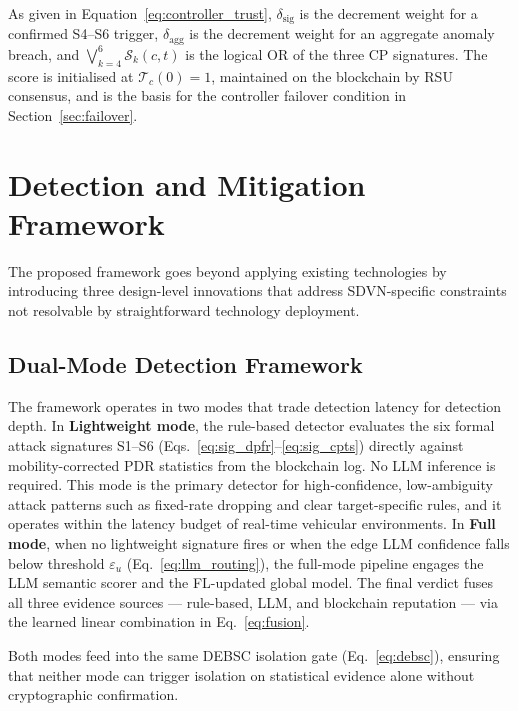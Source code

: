 \documentclass[12pt, a4paper]{report}
\begin{document}
As given in Equation~\eqref{eq:controller_trust},
$\delta_{\text{sig}}$ is the decrement weight for a confirmed
S4--S6 trigger, $\delta_{\text{agg}}$ is the decrement weight for
an aggregate anomaly breach, and $\bigvee_{k=4}^{6}\mathcal{S}_k
(c,t)$ is the logical OR of the three CP signatures. The score
is initialised at $\mathcal{T}_c(0)=1$, maintained on the
blockchain by RSU consensus, and is the basis for the controller
failover condition in Section~\ref{sec:failover}.

\section{Detection and Mitigation Framework}
\label{sec:design}

The proposed framework goes beyond applying existing technologies by
introducing three design-level innovations that address SDVN-specific
constraints not resolvable by straightforward technology deployment.





\subsection{Dual-Mode Detection Framework}

The framework operates in two modes that trade detection latency for detection depth.
In \textbf{Lightweight mode}, the rule-based detector evaluates the six formal attack signatures S1--S6 (Eqs.~\eqref{eq:sig_dpfr}--\eqref{eq:sig_cpts}) directly against mobility-corrected PDR statistics from the blockchain log. No LLM inference is required. This mode is the primary detector for high-confidence, low-ambiguity attack patterns such as fixed-rate dropping and clear target-specific rules, and it operates within the latency budget of real-time vehicular environments.
In \textbf{Full mode}, when no lightweight signature fires or when the edge LLM confidence falls below threshold $\varepsilon_u$ (Eq.~\eqref{eq:llm_routing}), the full-mode pipeline engages the LLM semantic scorer and the FL-updated global model. The final verdict fuses all three evidence sources — rule-based, LLM, and blockchain reputation — via the learned linear combination in Eq.~\eqref{eq:fusion}.

Both modes feed into the same DEBSC isolation gate (Eq.~\eqref{eq:debsc}), ensuring that neither mode can trigger isolation on statistical evidence alone without cryptographic confirmation.
\end{document}
